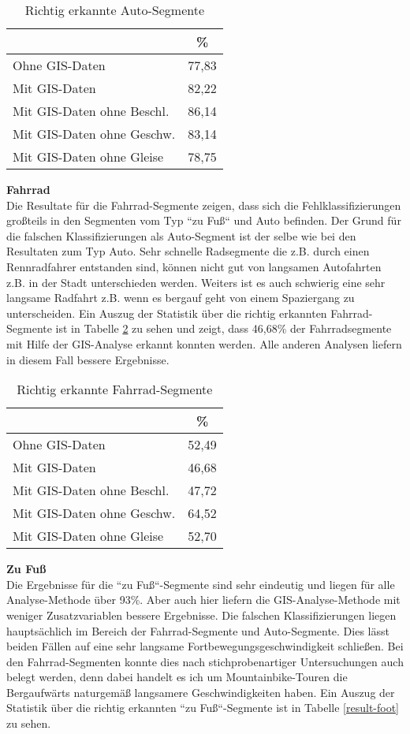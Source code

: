 \begin{table}[h]
\centering
\begin{tabular}{|l|c|}
\hline
 & \% \\ \hline
Ohne GIS-Daten & 77,83 \\ \hline
Mit GIS-Daten & 82,22 \\ \hline
Mit GIS-Daten ohne Beschl. & 86,14 \\ \hline
Mit GIS-Daten ohne Geschw. & 83,14 \\ \hline
Mit GIS-Daten ohne Gleise & 78,75 \\ \hline
\end{tabular}
\caption{Richtig erkannte Auto-Segmente}
\label{result-drive}
\end{table}

\textbf{Fahrrad} \\
Die Resultate für die Fahrrad-Segmente zeigen, dass sich die Fehlklassifizierungen großteils in den Segmenten vom Typ ``zu Fuß`` und Auto befinden. Der Grund für die falschen Klassifizierungen als Auto-Segment ist der selbe wie bei den Resultaten zum Typ Auto. Sehr schnelle Radsegmente die z.B. durch einen Rennradfahrer entstanden sind, können nicht gut von langsamen Autofahrten z.B. in der Stadt unterschieden werden. Weiters ist es auch schwierig eine sehr langsame Radfahrt z.B. wenn es bergauf geht von einem Spaziergang zu unterscheiden. Ein Auszug der Statistik über die richtig erkannten Fahrrad-Segmente ist in Tabelle \ref{result-bike} zu sehen und zeigt, dass 46,68\% der Fahrradsegmente mit Hilfe der GIS-Analyse erkannt konnten werden. Alle anderen Analysen liefern in diesem Fall bessere Ergebnisse.

\begin{table}[h]
\centering
\begin{tabular}{|l|c|}
\hline
 & \% \\ \hline
Ohne GIS-Daten & 52,49 \\ \hline
Mit GIS-Daten & 46,68 \\ \hline
Mit GIS-Daten ohne Beschl. & 47,72 \\ \hline
Mit GIS-Daten ohne Geschw. & 64,52 \\ \hline
Mit GIS-Daten ohne Gleise & 52,70 \\ \hline
\end{tabular}
\caption{Richtig erkannte Fahrrad-Segmente}
\label{result-bike}
\end{table}

\textbf{Zu Fuß} \\
Die Ergebnisse für die ``zu Fuß``-Segmente sind sehr eindeutig und liegen für alle Analyse-Methode über 93\%.  Aber auch hier liefern die GIS-Analyse-Methode mit weniger Zusatzvariablen bessere Ergebnisse. Die falschen Klassifizierungen liegen hauptsächlich im Bereich der Fahrrad-Segmente und Auto-Segmente. Dies lässt beiden Fällen auf eine sehr langsame Fortbewegungsgeschwindigkeit schließen. Bei den Fahrrad-Segmenten konnte dies nach stichprobenartiger Untersuchungen auch belegt werden, denn dabei handelt es ich um Mountainbike-Touren die Bergaufwärts naturgemäß langsamere Geschwindigkeiten haben. Ein Auszug der Statistik über die richtig erkannten ``zu Fuß``-Segmente ist in Tabelle \ref{result-foot} zu sehen.

